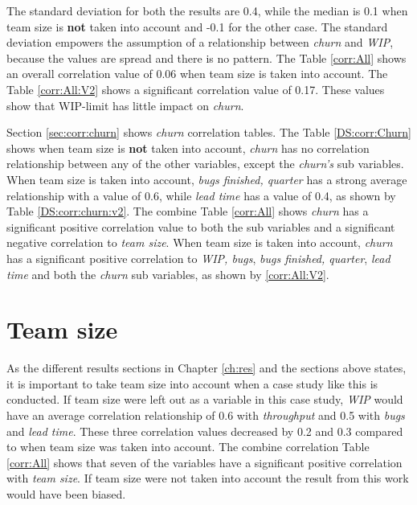 \documentclass[UKenglish]{ifimaster}  %
\begin{document}
The standard deviation for both the results are 0.4, while the median is 0.1 when team size is \textbf{not} taken into account and -0.1 for the other case. The standard deviation empowers the assumption of a relationship between \textit{churn} and \textit{WIP}, because the values are spread and there is no pattern.  The Table \ref{corr:All} shows an overall correlation value of 0.06 when team size is taken into account. The Table \ref{corr:All:V2} shows a significant correlation value of 0.17. These values show that WIP-limit has little impact on \textit{churn}.

Section \ref{sec:corr:churn} shows \textit{churn} correlation tables. The Table \ref{DS:corr:Churn} shows when team size is \textbf{not} taken into account, \textit{churn} has no correlation relationship between any of the other variables, except the \textit{churn's} sub variables. When  team size is taken into account, \textit{bugs finished, quarter} has a strong average relationship with a value of 0.6, while \textit{lead time} has a value of 0.4, as shown by Table \ref{DS:corr:churn:v2}. The combine Table \ref{corr:All} shows \textit{churn} has a significant positive correlation value to both the sub variables and a significant negative correlation to \textit{team size}. When team size is taken into account, \textit{churn} has a significant positive correlation to \textit{WIP, bugs}, \textit{bugs finished, quarter}, \textit{lead time} and  both the \textit{churn} sub variables, as shown by \ref{corr:All:V2}. 


\section{Team size}
As the different results sections in Chapter \ref{ch:res} and the sections above states, it is important to take team size into account when a case study like this is conducted. If team size were left out as a variable in this case study, \textit{WIP} would have an average correlation relationship of 0.6 with \textit{throughput} and 0.5 with \textit{bugs} and \textit{lead time}. These three correlation values decreased by 0.2  and 0.3 compared to when  team size was taken into account. The combine correlation Table  \ref{corr:All} shows that seven of the variables have a significant positive correlation with \textit{team size}.  If team size were not taken into account the result from this work would have been biased. 

\end{document}
